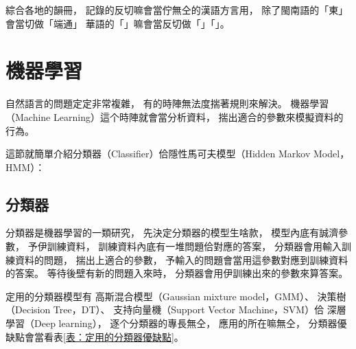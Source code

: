 綜合各地的韻冊，
記錄的反切嘛會當佇無仝的漢語方言用，
除了閩南語的「東」會當切做「端通」
華語的「」嘛會當反切做「」「」。








%

%


\section{機器學習}
\label{節：機器學習}
自然語言的問題定定非常複雜，
有的時陣無法度揣著規則來解決。
機器學習（Machine Learning）這个時陣就會當分析資料，
揣出適合的參數來模擬資料的行為。

這節就簡單介紹分類器（Classifier）佮隱性馬可夫模型（Hidden Markov Model，HMM）：

\subsection{分類器}
\label{小節：分類器}
分類器是機器學習的一類研究，
先決定分類器的模型生啥款，
模型內底有誠濟參數，
予伊訓練資料，
訓練資料內底有一堆問題佮對應的答案，
分類器會用輸入訓練資料的問題，
揣出上適合的參數， 
予輸入的問題會當用這參數對應到訓練資料的答案。
等待後壁有新的問題入來時，
分類器會用伊訓練出來的參數來算答案。

定用的分類器模型有
高斯混合模型（Gaussian mixture model，GMM）、
決策樹（Decision Tree，DT）、
支持向量機（Support Vector Machine，SVM）佮
深層學習（Deep learning），
逐个分類器的專長無仝，
應用的所在嘛無仝，
分類器優缺點會當看表\ref{表：定用的分類器優缺點}。

